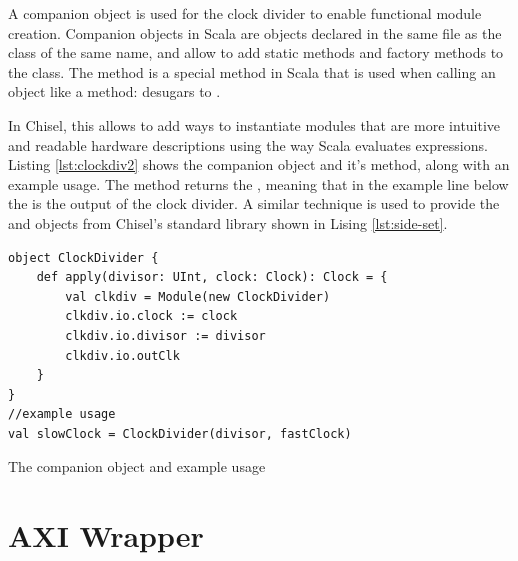 A companion object is used for the clock divider to enable functional module creation. Companion objects in Scala are objects declared in the same file as the class of the same name, and allow to add static methods and factory methods to the class. The  method is a special method in Scala that is used when calling an object like a method:  desugars to .

In Chisel, this allows to add ways to instantiate modules that are more intuitive and readable hardware descriptions using the way Scala evaluates expressions. Listing \ref{lst:clockdiv2} shows the  companion object and it's  method, along with an example usage. The method returns the , meaning that in the example line below the  is the output of the clock divider. A similar technique is used to provide the  and  objects from Chisel's standard library shown in Lising \ref{lst:side-set}.

\begin{listing}[h!]
    \centering
    \vspace{0.5cm}
    \begin{verbatim}
object ClockDivider {
    def apply(divisor: UInt, clock: Clock): Clock = {
        val clkdiv = Module(new ClockDivider)
        clkdiv.io.clock := clock
        clkdiv.io.divisor := divisor
        clkdiv.io.outClk
    }
}
//example usage
val slowClock = ClockDivider(divisor, fastClock)
    \end{verbatim}
    \caption{The  companion object and example usage}
    \label{lst:clockdiv2}
\end{listing}


\section{AXI Wrapper}
